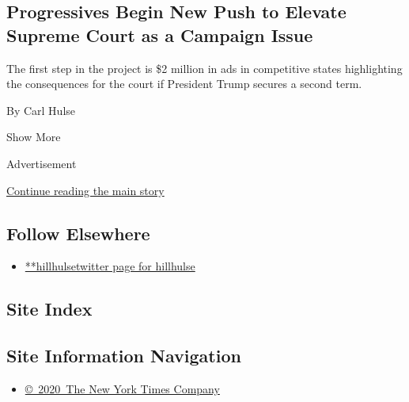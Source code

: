 \begin{enumerate}
  \hypertarget{progressives-begin-new-push-to-elevate-supreme-court-as-a-campaign-issue}{%
  \subsection{Progressives Begin New Push to Elevate Supreme Court as a
  Campaign
  Issue}\label{progressives-begin-new-push-to-elevate-supreme-court-as-a-campaign-issue}}

  The first step in the project is \$2 million in ads in competitive
  states highlighting the consequences for the court if President Trump
  secures a second term.

  By Carl Hulse
\end{enumerate}

Show More

Advertisement

\protect\hyperlink{after-mid2}{Continue reading the main story}

\hypertarget{follow-elsewhere}{%
\subsection{Follow Elsewhere}\label{follow-elsewhere}}

\begin{itemize}
\tightlist
\item
  \href{https://twitter.com/hillhulse}{**hillhulsetwitter page for
  hillhulse}
\end{itemize}

\hypertarget{site-index}{%
\subsection{Site Index}\label{site-index}}

\hypertarget{site-information-navigation}{%
\subsection{Site Information
Navigation}\label{site-information-navigation}}

\begin{itemize}
\tightlist
\item
  \href{https://help.nytimes.com/hc/en-us/articles/115014792127-Copyright-notice}{©~2020~The
  New York Times Company}
\end{itemize}

